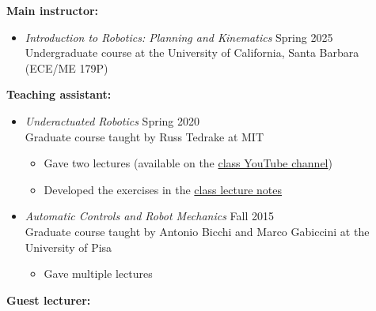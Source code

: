 \documentclass[11pt,a4paper,sans]{moderncv}
\begin{document}
\textbf{Main instructor:}

\vspace{5pt}

\begin{itemize}
\item \textit{Introduction to Robotics: Planning and Kinematics} \hfill Spring 2025 \\
Undergraduate course at the University of California, Santa Barbara (ECE/ME 179P)
\end{itemize}

\vspace{5pt}

\textbf{Teaching assistant:}

\vspace{5pt}

\begin{itemize}

\item \textit{Underactuated  Robotics} \hfill Spring 2020 \\
Graduate course taught by Russ Tedrake at MIT
\begin{itemize}
\item
Gave two lectures (available on the  \href{https://www.youtube.com/playlist?list=PLkx8KyIQkMfX1WpWYqtep7TOmboZeDtev}{\color{cyan}class YouTube channel})
\item
Developed the exercises in the \href{http://underactuated.csail.mit.edu}{\color{cyan}class lecture notes}
\end{itemize}

\item \textit{Automatic Controls and Robot Mechanics} \hfill Fall 2015 \\
Graduate course taught by Antonio Bicchi and Marco Gabiccini at the University of Pisa
\begin{itemize}
\item
Gave multiple lectures
\end{itemize}

\end{itemize}

\vspace{5pt}

\textbf{Guest lecturer:}

\vspace{5pt}
\end{document}
